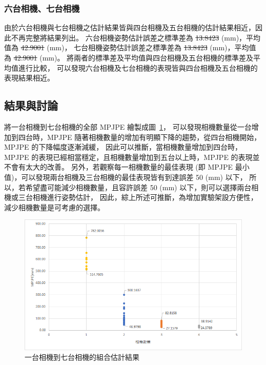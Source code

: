 \subsubsection{六台相機、七台相機}
由於六台相機與七台相機之估計結果皆與四台相機及五台相機的估計結果相近，因此不再完整將結果列出。
六台相機姿勢估計誤差之標準差為 \sout{13.8423} (mm)，平均值為 \sout{42.9001} (mm)，
七台相機姿勢估計誤差之標準差為 \sout{13.8423} (mm)，平均值為 \sout{42.9001} (mm)。
將兩者的標準差及平均值與四台相機及五台相機的標準差及平均值進行比較，
可以發現六台相機及七台相機的表現皆與四台相機及五台相機的表現結果相近。

\subsection{結果與討論}
將一台相機到七台相機的全部 MPJPE 繪製成圖~\ref{ch3_fig_1to7cam}，
可以發現相機數量從一台增加到四台時，MPJPE 隨著相機數量的增加有明顯下降的趨勢，從四台相機開始，MPJPE 的下降幅度逐漸減緩，
因此可以推斷，當相機數量增加到四台時，MPJPE 的表現已經相當穩定，且相機數量增加到五台以上時，MPJPE 的表現並不會有太大的改善。
另外，若觀察每一相機數量的最佳表現 (即 MPJPE 最小值)，可以發現兩台相機及三台相機的最佳表現皆有到達誤差 50 (mm) 以下，
所以，若希望盡可能減少相機數量，且容許誤差 50 (mm) 以下，則可以選擇兩台相機或三台相機進行姿勢估計，
因此，綜上所述可推斷，為增加實驗架設方便性，減少相機數量是可考慮的選擇。
\begin{figure}[!ht]
   \centering
   \includegraphics[width=12cm]{figure/ch3_fig_1to7cam.png}
   \caption[一台相機到七台相機的組合估計結果]{一台相機到七台相機的組合估計結果}
   \label{ch3_fig_1to7cam}
\end{figure}


